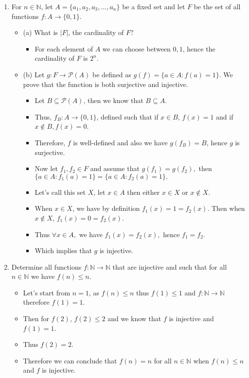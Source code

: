 \documentclass[letterpaper,12pt]{article}
\begin{document}
\begin{enumerate}
\begin{itemize}
\end{itemize}
\item For $n \in \mathbb{N}$, let $A = \{a_1,a_2,a_3, \dots , a_n\}$ be a fixed set and let $F$ be the set of all functions $f:A \rightarrow \{0,1\}.$
\begin{itemize}
	\item (a) What is $|F|$, the cardinality of $F?$
	\begin{itemize}
	\item For each element of $A$ we can choose between $0,1$, hence the cardinality of $F$ is $2^n$.
	\end{itemize}
	\item (b) Let $g: F \rightarrow \mathcal{P}(A)$ be defined as $g(f) = \{a \in  A: f(a) =1 \}$. We prove that the function is both surjective and injective.
	\begin{itemize}
	\item Let $B\subseteq \mathcal{P}(A)$, then we know that $B \subseteq A$.
	\item Thus, $f_B: A  \rightarrow \{0,1\}$, defined such that if $x \in B$, $f(x) = 1$ and if $x \notin B,f(x) = 0$. 
	\item Therefore, $f$ is well-defined and also we have $g(f_B)=B$, hence $g$ is surjective.
	\item Now let $f_1,f_2 \in F$ and assume that $g(f_1) = g(f_2),$ then $\{a\in A : f_1(a)=1\}= \{a \in  A : f_2(a)=1\}. $ 
	\item Let's call this set $X$, let $x\in A$ then either $x\in X$ or $x\notin X$.
	\item When $x \in X$, we have by definition $f_1(x)=1=f_2(x)$. Then when $x \notin X$, $f_1(x)=0=f_2(x)$. 
	\item Thus $\forall x \in A ,$ we have $f_1(x)=f_2(x),$ hence $f_1=f_2$.
	\item Which implies that $g$ is injective.
 	\end{itemize}
\end{itemize}
\item Determine all functions $f:\mathbb{N} \rightarrow \mathbb{N}$ that are injective and such that for all $n \in \mathbb{N}$ we have $f(n) \leq n$.
\begin{itemize}
	\item Let's start from $n=1$, as $f(n) \leq n $ thus $f(1) \leq 1$ and $f: \mathbb{N} \rightarrow \mathbb{N}$ therefore $f(1) = 1$.
	\item Then for $f(2)$, $f(2) \leq 2$ and we know that $f$ is injective and $f(1) = 1$.
	\item Thus $f(2) =2$.
	\item Therefore we can conclude that $f(n) =n$ for all $n \in \mathbb{N}$
	when $f(n) \leq n$ and $f$ is injective. 
	\end{itemize}
\end{enumerate}



\end{document}
